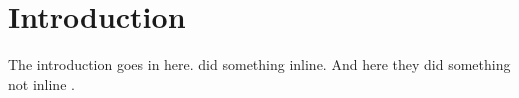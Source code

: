 \chapter{Introduction}


The introduction goes in here.  did something inline. And here they did something not inline \cite{clark-curran:07}.

